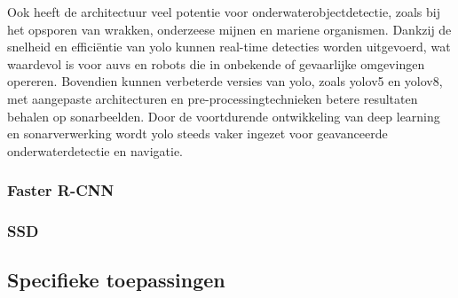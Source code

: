 Ook heeft de architectuur veel potentie voor onderwaterobjectdetectie, zoals bij het opsporen van wrakken, onderzeese mijnen en mariene organismen. Dankzij de snelheid en efficiëntie van \gls{yolo} kunnen real-time detecties worden uitgevoerd, wat waardevol is voor \glspl{auv} en robots die in onbekende of gevaarlijke omgevingen opereren. Bovendien kunnen verbeterde versies van \gls{yolo}, zoals \gls{yolo}v5 en \gls{yolo}v8, met aangepaste architecturen en pre-processingtechnieken betere resultaten behalen op sonarbeelden. Door de voortdurende ontwikkeling van deep learning en sonarverwerking wordt \gls{yolo} steeds vaker ingezet voor geavanceerde onderwaterdetectie en navigatie. \autocite{Chen_2023}

\subsubsection{Faster R-CNN}

\lipsum[1]

\autocite{Ren_2015}
\autocite{Wang_2023}
\autocite{Zeng_2021}
\autocite{Yulin_2020}

\subsubsection{SSD}

\lipsum[1]

\autocite{Ma_2020}
\autocite{Kumar_2020}
\autocite{Liu_2016}
\autocite{Jiang_2020}

\subsection{Specifieke toepassingen}

\lipsum[1-3]